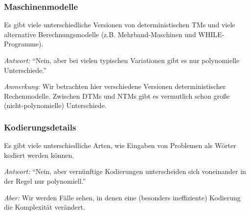 \documentclass[onlymath]{beamer}
\begin{document}
\begin{frame}\frametitle{Maschinenmodelle}

Es gibt viele unterschiedliche Versionen von deterministischen TMs und viele alternative Berechnungsmodelle (z.B. Mehrband-Maschinen und WHILE-Programme).\medskip

\bigskip\pause

\emph{Antwort:} "`Nein, aber bei vielen typischen Variationen gibt es nur polynomielle Unterschiede."'\bigskip


{\tiny \emph{Anmerkung:} Wir betrachten hier verschiedene Versionen deterministischer
Rechenmodelle. Zwischen DTMs und NTMs gibt es vermutlich
schon große (nicht-polynomielle) Unterschiede.

}

\end{frame}

\begin{frame}\frametitle{Kodierungsdetails}

Es gibt viele unterschiedliche Arten, wie Eingaben von Problemen als Wörter
kodiert werden können.\medskip

\bigskip\pause

\emph{Antwort:} "`Nein, aber vernünftige Kodierungen unterscheiden sich voneinander
in der Regel nur polynomiell."'\bigskip

\bigskip

\emph{Aber:} Wir werden Fälle sehen, in denen eine (besonders ineffiziente) Kodierung die Komplexität verändert.

\end{frame}
\end{document}
